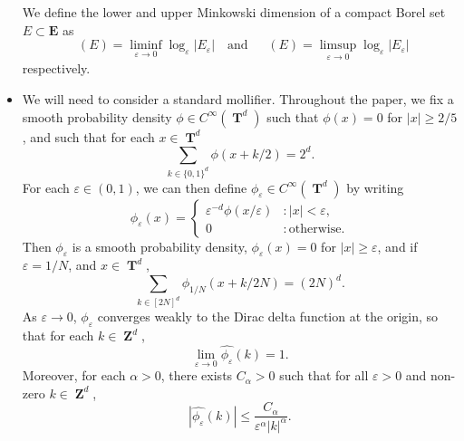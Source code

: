 \documentclass[12pt,reqno]{article}
\DeclareMathOperator{\lowminkdim}{\underline{\dim}_{\mathbf{M}}}
\DeclareMathOperator{\upminkdim}{\overline{\dim}_{\mathbf{M}}}
\DeclareMathOperator{\ZZ}{\mathbf{Z}}
\DeclareMathOperator{\TT}{\mathbf{T}}
\begin{document}
\begin{itemize}
    We define the lower and upper Minkowski dimension of a compact Borel set $E \subset \mathbf{E}$ as
    \[ \lowminkdim(E) = \liminf_{\varepsilon \to 0} \log_\varepsilon|E_\varepsilon| \quad\text{and}\quad \upminkdim(E) = \limsup_{\varepsilon \to 0} \log_\varepsilon |E_\varepsilon| \]
    respectively.

    \item We will need to consider a standard mollifier. Throughout the paper, we fix a smooth probability density $\phi \in C^\infty(\TT^d)$ such that $\phi(x) = 0$ for $|x| \geq 2/5$, and such that for each $x \in \TT^d$
    \[ \sum_{k \in \{ 0, 1 \}^d} \phi(x + k/2) = 2^d. \]
    For each $\varepsilon \in (0,1)$, we can then define $\phi_\varepsilon \in C^\infty(\TT^d)$ by writing
    \[ \phi_\varepsilon(x) = \begin{cases} \varepsilon^{-d} \phi(x/\varepsilon) &: |x| < \varepsilon, \\ 0 &: \text{otherwise}. \end{cases} \]
    Then $\phi_\varepsilon$ is a smooth probability density, $\phi_\varepsilon(x) = 0$ for $|x| \geq \varepsilon$, and if $\varepsilon = 1/N$, and $x \in \TT^d$,
    \begin{equation} \label{equation5550002352124124512}
        \sum_{k \in [2N]^d} \phi_{1/N}(x + k/2N) = (2N)^d.
    \end{equation}
    As $\varepsilon \to 0$, $\phi_\varepsilon$ converges weakly to the Dirac delta function at the origin, so that for each $k \in \ZZ^d$,
    \begin{equation} \label{approximationtoidentitypointwiseconvergence}
        \lim_{\varepsilon \to 0} \widehat{\phi_\varepsilon}(k) = 1.
    \end{equation}
    Moreover, for each $\alpha > 0$, there exists $C_\alpha > 0$ such that for all $\varepsilon > 0$ and non-zero $k \in \ZZ^d$,
    \begin{equation} \label{molificationdecaybound}
        |\widehat{\phi_\varepsilon}(k)| \leq \frac{C_\alpha}{\varepsilon^\alpha |k|^\alpha}.
    \end{equation}

    \begin{comment}


\end{comment}
\end{itemize}
\end{document}
